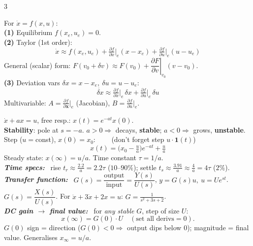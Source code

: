 \documentclass[9pt]{extarticle}
\newcommand{\sect}[1]{%
  \vspace{2pt}\par\noindent
  \colorbox{hdrbg}{\makebox[\dimexpr\linewidth-2\fboxsep][l]{%
    \textbf{\footnotesize\textcolor{hdr}{#1}}}}%
  \par\vspace{1.5pt}}
\newcommand{\sub}[1]{\textit{\textbf{#1:}}\ }
\begin{document}
\begin{multicols}{3}
\sect{2. Linearisation (Lec 2)}
For $\dot x=f(x,u)$:\\
\textbf{(1)} Equilibrium $f(x_e,u_e)=0$.\\
\textbf{(2)} Taylor (1st order):
\[ \dot x\approx f(x_e,u_e)+\tfrac{\partial f}{\partial x}\Big|_e(x-x_e)+\tfrac{\partial f}{\partial u}\Big|_e(u-u_e) \]
General (scalar) form: $F(v_0{+}\delta v)\approx F(v_0)+\left.\dfrac{\partial F}{\partial v}\right|_{v_0}(v-v_0)$.\\
\textbf{(3)} Deviation vars $\delta x=x-x_e,\ \delta u=u-u_e$:
\[ \dot{\delta x}\approx \tfrac{\partial f}{\partial x}\big|_e\,\delta x+\tfrac{\partial f}{\partial u}\big|_e\,\delta u \]
Multivariable: $A=\tfrac{\partial f}{\partial \mathbf x}\big|_e$ (Jacobian), $B=\tfrac{\partial f}{\partial u}\big|_e$.

\sect{3. First-Order Systems (Lec 3)}
$\dot x+ax=u$, free resp.: $x(t)=e^{-at}x(0)$.\\
\textbf{Stability}: pole at $s{=}-a$. $a{>}0\Rightarrow$ decays, \textbf{stable}; $a{<}0\Rightarrow$ grows, \textbf{unstable}.\\
Step ($u{=}$const), $x(0){=}x_0$:$\qquad$ (don't forget step $u\cdot\mathbf{1}(t)$)
\[ x(t)=\Big(x_0-\tfrac{u}{a}\Big)e^{-at}+\tfrac{u}{a} \]
Steady state: $x(\infty)=u/a$. Time constant $\tau=1/a$.\\
\sub{Time specs} rise $t_r\approx\tfrac{2.2}{a}{=}2.2\tau$ ($10$--$90\%$); settle $t_s\approx\tfrac{3.91}{a}\approx\tfrac{4}{a}{=}4\tau$ ($2\%$).\\
\sub{Transfer function} $G(s)=\dfrac{\text{output}}{\text{input}}=\dfrac{Y(s)}{U(s)}$, $y=G(s)u,\ u=Ue^{st}$.\\
$G(s)=\dfrac{X(s)}{U(s)}$. For $\ddot x+3\dot x+2x=u$: $G=\tfrac{1}{s^2+3s+2}$.\\
\sub{DC gain $\to$ final value} for \emph{any stable} $G$, step of size $U$:
\[ x(\infty)=G(0)\cdot U \quad(\text{set all derivs}=0). \]
$G(0)$ sign = direction ($G(0){<}0\Rightarrow$ output dips below $0$); magnitude = final value. Generalises $x_\infty{=}u/a$.


\end{multicols}
\end{document}
